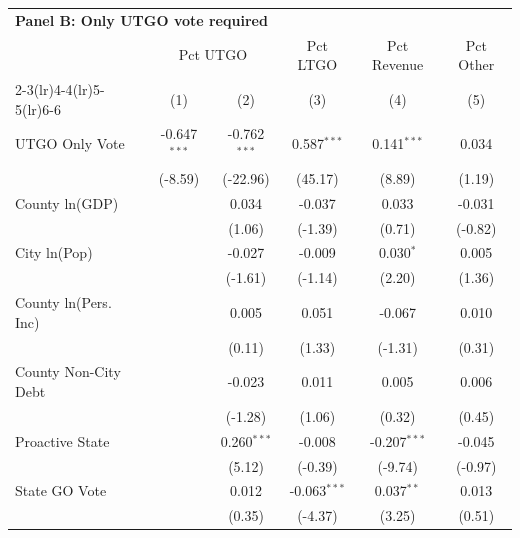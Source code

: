 \begingroup
\centering
\begin{tabular*}{\textwidth}{@{\extracolsep{\fill}}lccccc}
\multicolumn{5}{l}{\textbf{Panel B: Only UTGO vote required}}\\

\addlinespace
   \toprule
    & \multicolumn{2}{c}{Pct UTGO} & Pct LTGO & Pct Revenue & Pct Other\\
   \cmidrule(lr){2-3}\cmidrule(lr){4-4}\cmidrule(lr){5-5}\cmidrule(lr){6-6}
                        & (1)            & (2)            & (3)            & (4)            & (5)\\  
   \midrule 
   UTGO Only Vote       & -0.647$^{***}$ & -0.762$^{***}$ & 0.587$^{***}$  & 0.141$^{***}$  & 0.034\\   
                        & (-8.59)       & (-22.96)      & (45.17)       & (8.89)        & (1.19)\\   
   County ln(GDP)       &                & 0.034          & -0.037         & 0.033          & -0.031\\   
                        &                & (1.06)        & (-1.39)       & (0.71)        & (-0.82)\\   
   City ln(Pop)         &                & -0.027         & -0.009         & 0.030$^{*}$    & 0.005\\   
                        &                & (-1.61)       & (-1.14)       & (2.20)        & (1.36)\\   
   County ln(Pers. Inc) &                & 0.005          & 0.051          & -0.067         & 0.010\\   
                        &                & (0.11)        & (1.33)        & (-1.31)       & (0.31)\\   
   County Non-City Debt &                & -0.023         & 0.011          & 0.005          & 0.006\\   
                        &                & (-1.28)       & (1.06)        & (0.32)        & (0.45)\\   
   Proactive State      &                & 0.260$^{***}$  & -0.008         & -0.207$^{***}$ & -0.045\\   
                        &                & (5.12)        & (-0.39)       & (-9.74)       & (-0.97)\\   
   State GO Vote        &                & 0.012          & -0.063$^{***}$ & 0.037$^{**}$   & 0.013\\   
                        &                & (0.35)        & (-4.37)       & (3.25)        & (0.51)\\   

\end{tabular*}
